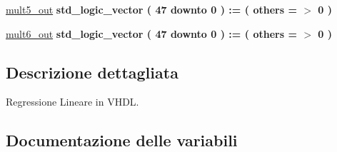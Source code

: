 \begin{DoxyCompactItemize}
\item 
\hyperlink{group___linear_regression_ga308e89f3c1df2b63a7dad6d0efa94e66}{mult5\+\_\+out} {\bfseries \textcolor{vhdlchar}{std\+\_\+logic\+\_\+vector}\textcolor{vhdlchar}{ }\textcolor{vhdlchar}{(}\textcolor{vhdlchar}{ }\textcolor{vhdlchar}{ } \textcolor{vhdldigit}{47} \textcolor{vhdlchar}{ }\textcolor{vhdlchar}{downto}\textcolor{vhdlchar}{ }\textcolor{vhdlchar}{ } \textcolor{vhdldigit}{0} \textcolor{vhdlchar}{ }\textcolor{vhdlchar}{)}\textcolor{vhdlchar}{ }\textcolor{vhdlchar}{ }\textcolor{vhdlchar}{ }\textcolor{vhdlchar}{\+:}\textcolor{vhdlchar}{=}\textcolor{vhdlchar}{ }\textcolor{vhdlchar}{(}\textcolor{vhdlchar}{ }\textcolor{vhdlchar}{ }\textcolor{vhdlchar}{others}\textcolor{vhdlchar}{ }\textcolor{vhdlchar}{ }\textcolor{vhdlchar}{=}\textcolor{vhdlchar}{ }\textcolor{vhdlchar}{$>$}\textcolor{vhdlchar}{ }\textcolor{vhdlchar}{\textquotesingle{}}\textcolor{vhdlchar}{ } \textcolor{vhdldigit}{0} \textcolor{vhdlchar}{ }\textcolor{vhdlchar}{\textquotesingle{}}\textcolor{vhdlchar}{ }\textcolor{vhdlchar}{)}\textcolor{vhdlchar}{ }} 
\item 
\hyperlink{group___linear_regression_ga207c875b3cd576e5064d6fd3b2a36759}{mult6\+\_\+out} {\bfseries \textcolor{vhdlchar}{std\+\_\+logic\+\_\+vector}\textcolor{vhdlchar}{ }\textcolor{vhdlchar}{(}\textcolor{vhdlchar}{ }\textcolor{vhdlchar}{ } \textcolor{vhdldigit}{47} \textcolor{vhdlchar}{ }\textcolor{vhdlchar}{downto}\textcolor{vhdlchar}{ }\textcolor{vhdlchar}{ } \textcolor{vhdldigit}{0} \textcolor{vhdlchar}{ }\textcolor{vhdlchar}{)}\textcolor{vhdlchar}{ }\textcolor{vhdlchar}{ }\textcolor{vhdlchar}{ }\textcolor{vhdlchar}{\+:}\textcolor{vhdlchar}{=}\textcolor{vhdlchar}{ }\textcolor{vhdlchar}{(}\textcolor{vhdlchar}{ }\textcolor{vhdlchar}{ }\textcolor{vhdlchar}{others}\textcolor{vhdlchar}{ }\textcolor{vhdlchar}{ }\textcolor{vhdlchar}{=}\textcolor{vhdlchar}{ }\textcolor{vhdlchar}{$>$}\textcolor{vhdlchar}{ }\textcolor{vhdlchar}{\textquotesingle{}}\textcolor{vhdlchar}{ } \textcolor{vhdldigit}{0} \textcolor{vhdlchar}{ }\textcolor{vhdlchar}{\textquotesingle{}}\textcolor{vhdlchar}{ }\textcolor{vhdlchar}{)}\textcolor{vhdlchar}{ }} 
\end{DoxyCompactItemize}


\subsection{Descrizione dettagliata}
Regressione Lineare in V\+H\+DL. 



\subsection{Documentazione delle variabili}
\mbox{\label{group___linear_regression_gae1ad6503d157f6c26abdce1131d31ec2}} 
